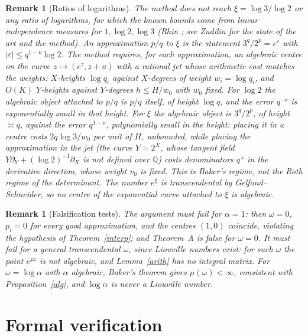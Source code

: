 \documentclass[11pt]{amsart}
\newtheorem{remark}[lemma]{Remark}
\newcommand{\Q}{\mathbb{Q}}
\newcommand{\eps}{\varepsilon}
\begin{document}
\begin{remark}[Ratios of logarithms]
The method does not reach $\xi=\log3/\log2$ or any ratio of logarithms, for which the known bounds come from linear independence measures for $1,\log2,\log3$ (Rhin \cite{Rhin}; see Zudilin \cite{Zud} for the state of the art and the method). An approximation $p/q$ to $\xi$ is the statement $3^q/2^p=e^{\eps}$ with $|\eps|\le q^{1-\nu}\log2$. The method requires, for each approximation, an algebraic centre on the curve $z\mapsto(e^z,z+u)$ with a rational jet whose arithmetic cost matches the weights: $X$-heights $\log q_i$ against $X$-degrees of weight $w_i=\log q_i$, and $O(K)$ $Y$-heights against $Y$-degrees $h\le H/w_0$ with $w_0$ fixed. For $\log2$ the algebraic object attached to $p/q$ is $p/q$ itself, of height $\log q$, and the error $q^{-\nu}$ is exponentially small in that height. For $\xi$ the algebraic object is $3^q/2^p$, of height $\asymp q$, against the error $q^{1-\nu}$, polynomially small in the height: placing it in a centre costs $2q\log3/w_0$ per unit of $H$, unbounded, while placing the approximation in the jet (the curve $Y=2^X$, whose tangent field $Y\partial_Y+(\log2)^{-1}\partial_X$ is not defined over $\Q$) costs denominators $q^{\,s}$ in the derivative direction, whose weight $v_0$ is fixed. This is Baker's regime, not the Roth regime of the determinant. The number $e^\xi$ is transcendental by Gelfond--Schneider, so no centre of the exponential curve attached to $\xi$ is algebraic.
\end{remark}

\begin{remark}[Falsification tests]
The argument must fail for $\alpha=1$: then $\omega=0$, $p_i=0$ for every good approximation, and the centres $(1,0)$ coincide, violating the hypothesis of Theorem~\ref{interp}; and Theorem~A is false for $\omega=0$. It must fail for a general transcendental $\omega$, since Liouville numbers exist: for such $\omega$ the point $e^{j\omega}$ is not algebraic, and Lemma~\ref{arith} has no integral matrix. For $\omega=\log\alpha$ with $\alpha$ algebraic, Baker's theorem gives $\mu(\omega)<\infty$, consistent with Proposition~\ref{alg}, and $\log\alpha$ is never a Liouville number.
\end{remark}


\section{Formal verification}\label{sec:formal}
\end{document}
